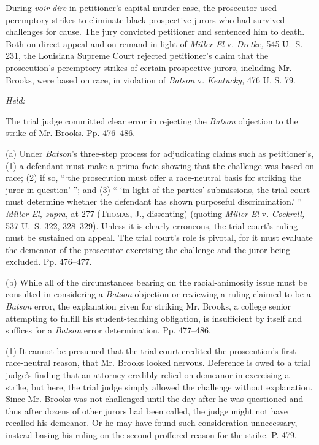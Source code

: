 
\setcounter{page}{472}

\noindent During \emph{voir dire} in petitioner's capital murder case, the
prosecutor used peremptory strikes to eliminate black prospective jurors
who had survived challenges for cause. The jury convicted petitioner and
sentenced him to death. Both on direct appeal and on remand in light of
\emph{Miller-El} v. \emph{Dretke,} 545 U.~S. 231, the Louisiana Supreme
Court rejected petitioner's claim that the prosecution's peremptory
strikes of certain prospective jurors, including Mr. Brooks, were based
on race, in violation of \emph{Batson} v. \emph{Kentucky,} 476 U. S. 79.

\emph{Held:}

\noindent The trial judge committed clear error in rejecting the \emph{Batson}
objection to the strike of Mr. Brooks. Pp. 476--486.

  (a) Under \emph{Batson}'s three-step process for adjudicating claims
such as petitioner's, (1) a defendant must make a prima facie showing
that the challenge was based on race; (2) if so, ``‘the prosecution
must offer a race-neutral basis for striking the juror in question'
''; and (3) `` ‘in light of the parties' submissions, the trial
court must determine whether the defendant has shown purposeful
discrimination.' '' \emph{Miller-El, supra,} at 277 (\textsc{Thomas,} J.,
dissenting) (quoting \emph{Miller-El} v. \emph{Cockrell,} 537 U.~S. 322,
328--329). Unless it is clearly erroneous, the trial court's ruling
must be sustained on appeal. The trial court's role is pivotal, for it
must evaluate the demeanor of the prosecutor exercising the challenge
and the juror being excluded. Pp. 476--477.

  (b) While all of the circumstances bearing on the racial-animosity
issue must be consulted in considering a \emph{Batson} objection or
reviewing a ruling claimed to be a \emph{Batson} error, the explanation
given for striking Mr. Brooks, a college senior attempting to fulfill
his student-teaching obligation, is insufficient by itself and suffices
for a \emph{Batson} error determination. Pp. 477--486.

(1) It cannot be presumed that the trial court credited the
prosecution's first race-neutral reason, that Mr. Brooks looked
nervous. Deference is owed to a trial judge's finding that an attorney
credibly relied on demeanor in exercising a strike, but here, the trial
judge simply allowed the challenge without explanation. Since Mr.
Brooks was not challenged until the day after he was questioned and
thus after dozens of other jurors had been called, the judge might not
have recalled his demeanor. Or he may have found such consideration
unnecessary, in\newpage stead basing his ruling on the second proffered
reason for the strike. P. 479.

